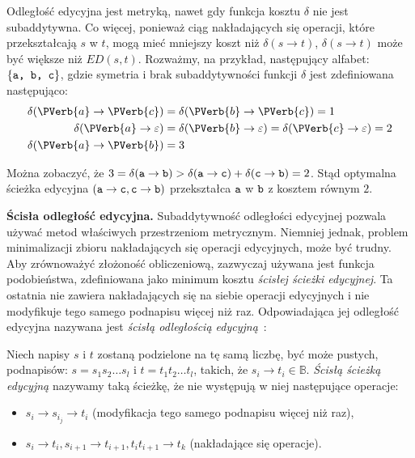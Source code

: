 \documentclass{praca1}
\begin{document}
Odległość edycyjna jest metryką, nawet gdy funkcja kosztu $\delta$ nie jest subaddytywna. Co więcej, ponieważ ciąg nakładających się operacji, które przekształcają $s$ w $t$, mogą mieć mniejszy koszt niż $\delta(s \rightarrow t)$, $\delta(s \rightarrow t)$ może być większe niż $ED(s,t)$. Rozważmy, na przykład, następujący alfabet: $\{\verb|a, b, c|\}$, gdzie symetria i brak subaddytywności funkcji $\delta$ jest zdefiniowana następująco:
\begin{align*}
\delta(\PVerb{a} \rightarrow \PVerb{c}) &= \delta(\PVerb{b} \rightarrow \PVerb{c}) = 1 \\
\delta(\PVerb{a} \rightarrow \varepsilon) &= \delta(\PVerb{b} \rightarrow \varepsilon) = \delta(\PVerb{c} \rightarrow \varepsilon) = 2 \\
\delta(\PVerb{a} \rightarrow \PVerb{b}) &= 3
\end{align*}

Można zobaczyć, że $3 = \delta(\verb|a| \rightarrow \verb|b|) > \delta(\verb|a| \rightarrow \verb|c|) + \delta(\verb|c| \rightarrow \verb|b|) = 2$. Stąd optymalna ścieżka edycyjna $(\verb|a| \rightarrow \verb|c|, \verb|c| \rightarrow \verb|b|)$ przekształca $\verb|a|$ w $\verb|b|$ z kosztem równym $2$.

\textbf{Ścisła odległość edycyjna.} Subaddytywność odległości edycyjnej pozwala używać metod właściwych przestrzeniom metrycznym. Niemniej jednak, problem minimalizacji zbioru nakładających się operacji edycyjnych, może być trudny. Aby zrównoważyć złożoność obliczeniową, zazwyczaj używana jest funkcja podobieństwa, zdefiniowana jako minimum kosztu \emph{ścisłej ścieżki edycyjnej}. Ta ostatnia nie zawiera nakładających się na siebie operacji edycyjnych i nie modyfikuje tego samego podnapisu więcej niż raz. Odpowiadająca jej odległość edycyjna nazywana jest \emph{ścisłą odległością edycyjną}~\cite{Boytsov2011:indexingmethods}:

\begin{definition}
Niech napisy $s$ i $t$ zostaną podzielone na tę samą liczbę, być może pustych, podnapisów: $s = s_1 s_2 \ldots s_l$ i $t = t_1 t_2 \ldots t_l$, takich, że $s_i \rightarrow t_i \in \mathbb{B}$. \emph{Ścisłą ścieżką edycyjną} nazywamy taką ścieżkę, że nie występują w niej następujące operacje:
\begin{itemize}
\item $s_i \rightarrow s_{i_j} \rightarrow t_i$ (modyfikacja tego samego podnapisu więcej niż raz),
\item $s_i \rightarrow t_i, s_{i+1} \rightarrow t_{i+1}, t_it_{i+1} \rightarrow t_k$ (nakładające się operacje).
\end{itemize}
\end{definition}
\end{document}
